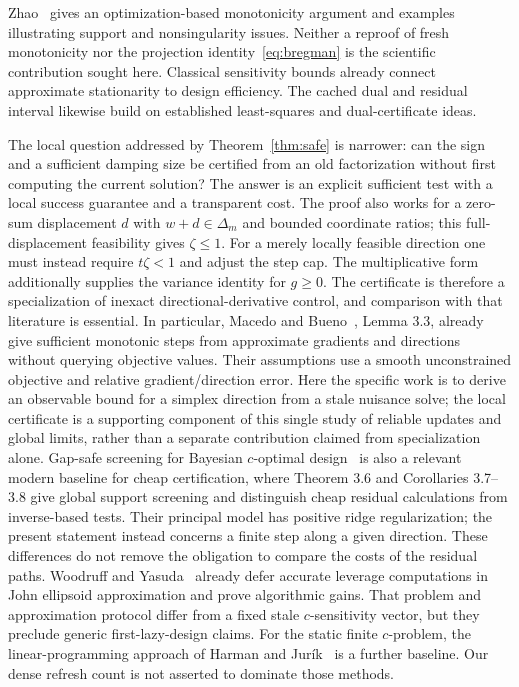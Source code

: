 \documentclass[11pt]{article}
\begin{document}
Zhao~\cite{zhao2025} gives an optimization-based monotonicity argument and examples illustrating support and nonsingularity issues.
Neither a reproof of fresh monotonicity nor the projection identity~\eqref{eq:bregman} is the scientific contribution sought here.
Classical sensitivity bounds already connect approximate stationarity to design efficiency.
The cached dual and residual interval likewise build on established least-squares and dual-certificate ideas.

The local question addressed by Theorem~\ref{thm:safe} is narrower: can the sign and a sufficient damping size be certified from an old factorization without first computing the current solution?
The answer is an explicit sufficient test with a local success guarantee and a transparent cost.
The proof also works for a zero-sum displacement $d$ with $w+d\in\Delta_m$ and bounded coordinate ratios; this full-displacement feasibility gives $\zeta\le1$. For a merely locally feasible direction one must instead require $t\zeta<1$ and adjust the step cap. The multiplicative form additionally supplies the variance identity for $g\ge0$. The certificate is therefore a specialization of inexact directional-derivative control, and comparison with that literature is essential. In particular, Macedo and Bueno~\cite{macedo2026}, Lemma 3.3, already give sufficient monotonic steps from approximate gradients and directions without querying objective values. Their assumptions use a smooth unconstrained objective and relative gradient/direction error. Here the specific work is to derive an observable bound for a simplex direction from a stale nuisance solve; the local certificate is a supporting component of this single study of reliable updates and global limits, rather than a separate contribution claimed from specialization alone.
Gap-safe screening for Bayesian $c$-optimal design~\cite{sagnol2023} is also a relevant modern baseline for cheap certification, where Theorem 3.6 and Corollaries 3.7--3.8 give global support screening and distinguish cheap residual calculations from inverse-based tests. Their principal model has positive ridge regularization; the present statement instead concerns a finite step along a given direction. These differences do not remove the obligation to compare the costs of the residual paths. Woodruff and Yasuda~\cite{woodruff2024} already defer accurate leverage computations in John ellipsoid approximation and prove algorithmic gains. That problem and approximation protocol differ from a fixed stale $c$-sensitivity vector, but they preclude generic first-lazy-design claims. For the static finite $c$-problem, the linear-programming approach of Harman and Jur\'ik~\cite{harman2008} is a further baseline. Our dense refresh count is not asserted to dominate those methods.
\end{document}
